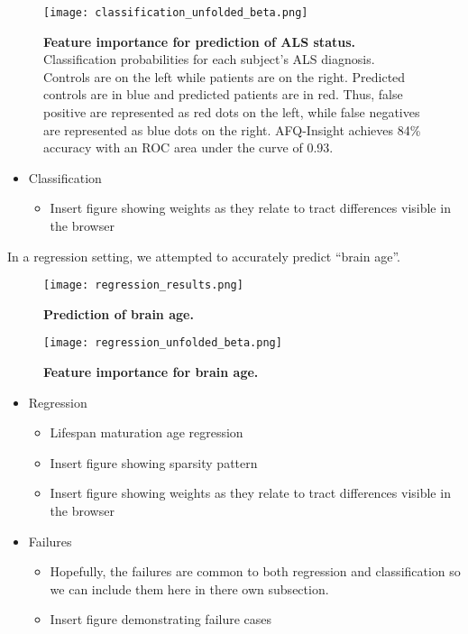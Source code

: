 \begin{figure}[!h]
    \centering
    \texttt{[image: classification\_unfolded\_beta.png]}
    \caption{{\bf Feature importance for prediction of ALS status.}
        Classification probabilities for each subject's ALS diagnosis. Controls are on the left while patients are on the right. Predicted controls are in blue and predicted patients are in red. Thus, false positive are represented as red dots on the left, while false negatives are represented as blue dots on the right. AFQ-Insight achieves 84\% accuracy with an ROC area under the curve of 0.93.
    }
    \label{fig:class-beta}
\end{figure}

\begin{itemize}
  \item Classification
    \begin{itemize}
      \item Insert figure showing weights as they relate to tract differences visible in the browser
    \end{itemize}
\end{itemize}

In a regression setting, we attempted to accurately predict ``brain age''.

\begin{figure}[!h]
    \centering
    \texttt{[image: regression\_results.png]}
    \caption{{\bf Prediction of brain age.}
    }
    \label{fig:class-results}
\end{figure}

\begin{figure}[!h]
    \centering
    \texttt{[image: regression\_unfolded\_beta.png]}
    \caption{{\bf Feature importance for brain age.}
    }
    \label{fig:class-beta}
\end{figure}

\begin{itemize}
  \item Regression
    \begin{itemize}
      \item Lifespan maturation age regression
      \item Insert figure showing sparsity pattern
      \item Insert figure showing weights as they relate to tract differences visible in the browser
    \end{itemize}
\end{itemize}
\begin{itemize}
  \item Failures
    \begin{itemize}
      \item Hopefully, the failures are common to both regression
        and classification so we can include them here in there own
        subsection.
      \item Insert figure demonstrating failure cases
    \end{itemize}
\end{itemize}
